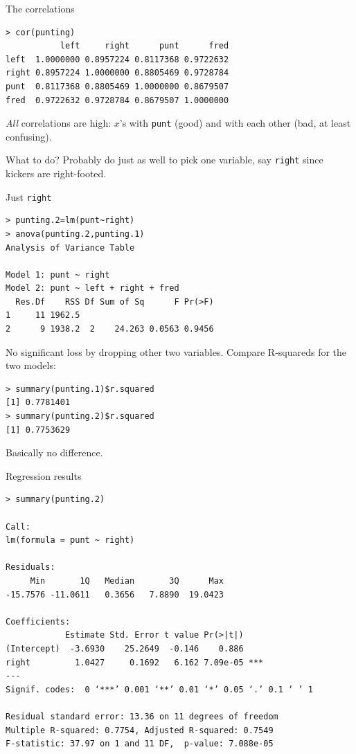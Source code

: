 \documentclass{beamer}
\begin{document}
\begin{frame}[fragile]{The correlations}  


{\scriptsize
\begin{verbatim}
> cor(punting)
           left     right      punt      fred
left  1.0000000 0.8957224 0.8117368 0.9722632
right 0.8957224 1.0000000 0.8805469 0.9728784
punt  0.8117368 0.8805469 1.0000000 0.8679507
fred  0.9722632 0.9728784 0.8679507 1.0000000
\end{verbatim}
}

{\em All} correlations are high: $x$'s with \verb-punt- (good) and
with each other (bad, at least confusing).

What to do? Probably do just as well to pick one variable, say
\texttt{right} since kickers are right-footed.

\end{frame}

\begin{frame}[fragile]{Just \texttt{right}}

{\scriptsize
\begin{verbatim}
> punting.2=lm(punt~right)
> anova(punting.2,punting.1)
Analysis of Variance Table

Model 1: punt ~ right
Model 2: punt ~ left + right + fred
  Res.Df    RSS Df Sum of Sq      F Pr(>F)
1     11 1962.5                           
2      9 1938.2  2    24.263 0.0563 0.9456
\end{verbatim}
}

No significant loss by dropping other two variables.
Compare R-squareds for the two models:

{\scriptsize
  \begin{verbatim}
> summary(punting.1)$r.squared
[1] 0.7781401
> summary(punting.2)$r.squared
[1] 0.7753629    
  \end{verbatim}
}

Basically no difference.
  
\end{frame}

\begin{frame}[fragile]{Regression results}
  
{\scriptsize
  \begin{verbatim}
> summary(punting.2)

Call:
lm(formula = punt ~ right)

Residuals:
     Min       1Q   Median       3Q      Max 
-15.7576 -11.0611   0.3656   7.8890  19.0423 

Coefficients:
            Estimate Std. Error t value Pr(>|t|)    
(Intercept)  -3.6930    25.2649  -0.146    0.886    
right         1.0427     0.1692   6.162 7.09e-05 ***
---
Signif. codes:  0 ‘***’ 0.001 ‘**’ 0.01 ‘*’ 0.05 ‘.’ 0.1 ‘ ’ 1 

Residual standard error: 13.36 on 11 degrees of freedom
Multiple R-squared: 0.7754,	Adjusted R-squared: 0.7549 
F-statistic: 37.97 on 1 and 11 DF,  p-value: 7.088e-05 
    
  \end{verbatim}
}
\end{frame}
\end{document}
